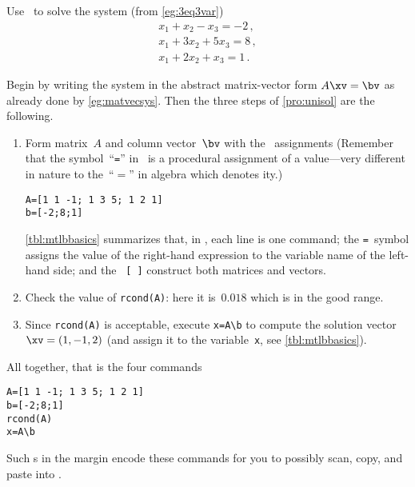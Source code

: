 \begin{example} \label{eg:3eq3varc}
Use \script\ to solve the system (from \cref{eg:3eq3var})
\begin{equation*}
\begin{array}{l}
x_1+x_2-x_3=-2\,,\\
x_1+3x_2+5x_3=8\,,\\
x_1+2x_2+x_3=1\,.
\end{array}
\end{equation*}
\begin{solution} 
Begin by writing the system in the abstract matrix-vector form \(A\xv=\bv\) as already done by \cref{eg:matvecsys}.
Then the three steps of \cref{pro:unisol} are the following.
\begin{enumerate}
\item Form matrix~\(A\) and {column vector}~\(\bv\) with the \script\ assignments
(Remember that the symbol~``\texttt{=}'' in \script\ is a procedural 
assignment of a value---very different in nature to the~``\(=\)'' in 
algebra which denotes ity.)
\begin{verbatim}
A=[1 1 -1; 1 3 5; 1 2 1]
b=[-2;8;1]
\end{verbatim}
\cref{tbl:mtlbbasics} summarizes that, in \script, each line is one command; the \verb|=|~symbol assigns the value of the right-hand expression to the variable name of the left-hand side; and the ~\verb|[ ]| construct both matrices and vectors.
\item Check the value of \verb|rcond(A)|: here it is~\(0.018\) which is in the good range.
\item Since \verb|rcond(A)| is acceptable,  execute \verb|x=A\b| to compute the solution vector~\(\xv=(1,-1,2)\) (and assign it to the variable~\verb|x|, see \cref{tbl:mtlbbasics}). 
\end{enumerate}
All together, that is the four commands
\begin{verbatim}
A=[1 1 -1; 1 3 5; 1 2 1]
b=[-2;8;1]
rcond(A)
x=A\b
\end{verbatim}
\setbox\ajrqrbox\hbox{}%
\marginajrbox%
\ifinQRcodes
Such s in the margin encode these commands for you to possibly scan, copy, and paste into \script.
\fi
\end{solution}
\end{example}


